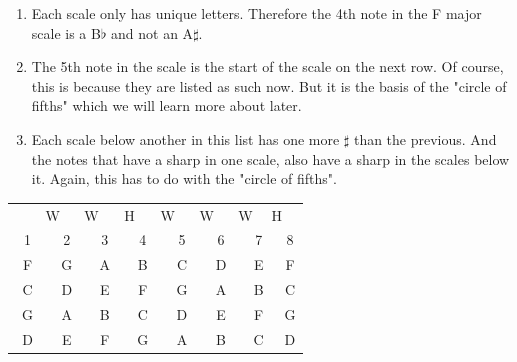 \begin{enumerate}
	\item Each scale only has unique letters. Therefore the 4th note in the F major scale is a B$\flat$ and not an A$\sharp$.
	\item The 5th note in the scale is the start of the scale on the next row. Of course, this is because they are listed as such now. But it is the basis of the "circle of fifths" which we will learn more about later.
	\item Each scale below another in this list has one more $\sharp$ than the previous. And the notes that have a sharp in one scale, also have a sharp in the scales below it. Again, this has to do with the "circle of fifths".
\end{enumerate}

\begin{table}[h]
	\centering
	\begin{tabular}{*{16}{c}}
		& \multicolumn{2}{P{4mm}}{\large{W}} & \multicolumn{2}{P{4mm}}{\large{W}} & \multicolumn{2}{P{4mm}}{\large{H}} & \multicolumn{2}{P{4mm}}{\large{W}} & \multicolumn{2}{P{4mm}}{\large{W}} & \multicolumn{2}{P{4mm}}{\large{W}} & \multicolumn{2}{P{4mm}}{\large{H}} & \\
		\multicolumn{2}{P{4mm}}{1} & \multicolumn{2}{P{4mm}}{2} & \multicolumn{2}{P{4mm}}{3} & \multicolumn{2}{P{4mm}}{4} & \multicolumn{2}{P{4mm}}{5} & \multicolumn{2}{P{4mm}}{6} & \multicolumn{2}{P{4mm}}{7} & \multicolumn{2}{P{4mm}}{8} \\
		\multicolumn{2}{P{4mm}}{F} & \multicolumn{2}{P{4mm}}{G} & \multicolumn{2}{P{4mm}}{A} & \multicolumn{2}{P{4mm}}{B\flat} & \multicolumn{2}{P{4mm}}{C} & \multicolumn{2}{P{4mm}}{D} & \multicolumn{2}{P{4mm}}{E} & \multicolumn{2}{P{4mm}}{F} \\
		\multicolumn{2}{P{4mm}}{C} & \multicolumn{2}{P{4mm}}{D} & \multicolumn{2}{P{4mm}}{E} & \multicolumn{2}{P{4mm}}{F} & \multicolumn{2}{P{4mm}}{G} & \multicolumn{2}{P{4mm}}{A} & \multicolumn{2}{P{4mm}}{B} & \multicolumn{2}{P{4mm}}{C} \\
		\multicolumn{2}{P{4mm}}{G} & \multicolumn{2}{P{4mm}}{A} & \multicolumn{2}{P{4mm}}{B} & \multicolumn{2}{P{4mm}}{C} & \multicolumn{2}{P{4mm}}{D} & \multicolumn{2}{P{4mm}}{E} & \multicolumn{2}{P{4mm}}{F\sharp} & \multicolumn{2}{P{4mm}}{G} \\
		\multicolumn{2}{P{4mm}}{D} & \multicolumn{2}{P{4mm}}{E} & \multicolumn{2}{P{4mm}}{F\sharp} & \multicolumn{2}{P{4mm}}{G} & \multicolumn{2}{P{4mm}}{A} & \multicolumn{2}{P{4mm}}{B} & \multicolumn{2}{P{4mm}}{C\sharp} & \multicolumn{2}{P{4mm}}{D} \\

\end{tabular}
\end{table}

